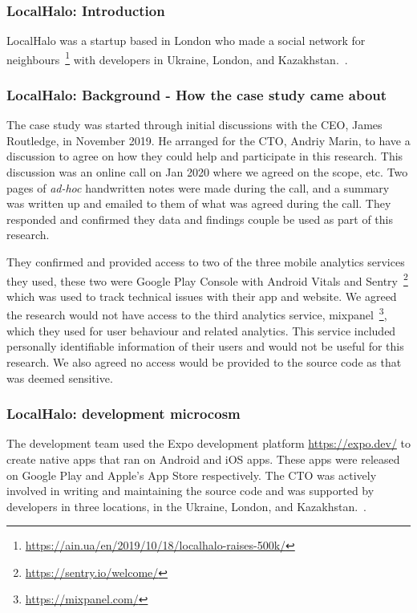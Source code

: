 \subsubsection{LocalHalo: Introduction}
LocalHalo was a startup based in London who made a social network for neighbours~\footnote{\url{https://ain.ua/en/2019/10/18/localhalo-raises-500k/}} with developers in Ukraine, London, and Kazakhstan.~\citep{karpenko2019_localhalo_a_social_network_for_neighbors}. 


\subsubsection{LocalHalo: Background - How the case study came about}
The case study was started through initial discussions with the CEO, James Routledge, in November 2019. He arranged for the CTO, Andriy Marin, to have a discussion to agree on how they could help and participate in this research. This discussion was an online call on  Jan 2020 where we agreed on the scope, etc. Two pages of \emph{ad-hoc} handwritten notes were made during the call, and a summary was written up and emailed to them of what was agreed during the call. They responded and confirmed they data and findings couple be used as part of this research.

They confirmed and provided access to two of the three mobile analytics services they used, these two were Google Play Console with Android Vitals and Sentry~\footnote{\url{https://sentry.io/welcome/}} which was used to track technical issues with their app and website. We agreed the research would not have access to the third analytics service, mixpanel~\footnote{\url{https://mixpanel.com/}}, which they used for user behaviour and related analytics. This service included personally identifiable information of their users and would not be useful for this research. We also agreed no access would be provided to the source code as that was deemed sensitive. 

\subsubsection{LocalHalo: development microcosm}
The development team used the Expo development platform \url{https://expo.dev/} to create native apps that ran on Android and iOS apps. These apps were released on Google Play and Apple's App Store respectively. The CTO was actively involved in writing and maintaining the source code and was supported by developers in three locations, in the Ukraine, London, and Kazakhstan.~\citep{karpenko2019_localhalo_a_social_network_for_neighbors}. 

